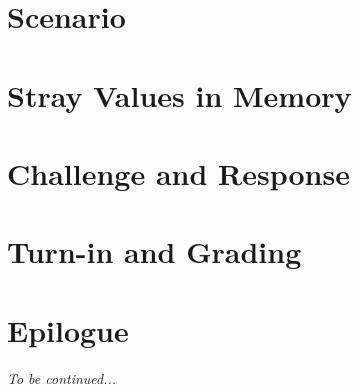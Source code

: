 




\captionsetup{width=.8\linewidth}
\makeatletter
\let\orig@lstnumber=\thelstnumber

\newcommand\lstsetnumber[1]{\gdef\thelstnumber{#1}}
\newcommand\lstresetnumber{\global\let\thelstnumber=\orig@lstnumber}
\makeatother

\renewcommand{\labnumber}{\pointerlabnumber}
\renewcommand{\labname}{Pointer Manipulation Lab}
\renewcommand{\shortlabname}{pointerlab}
\renewcommand{\collaborationrules}{\pointerlabcollaboration}
\renewcommand{\duedate}{\pointerlabdue}
\pagelayout

\labidentifier



\softwareengineeringfrontmatter

\section*{Scenario}                 \ArchieWroteSmellyCode

\section{Stray Values in Memory}    

\section{Challenge and Response}    

\section*{Turn-in and Grading}      

\section*{Epilogue} \InsurancePreview

\textit{To be continued...}


